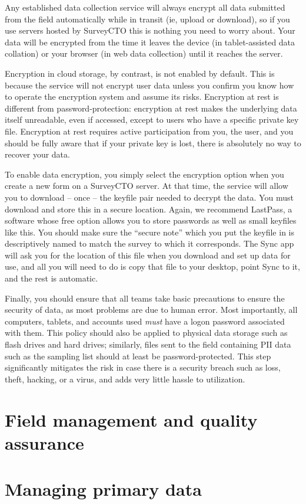 Any established data collection service will always encrypt
all data submitted from the field automatically while in transit
(ie, upload or download), so if you use servers hosted by SurveyCTO
this is nothing you need to worry about.
Your data will be encrypted from the time it leaves the device
(in tablet-assisted data collation) or your browser (in web data collection)
until it reaches the server.


Encryption in cloud storage, by contrast, is not enabled by default.
This is because the service will not encrypt user data unless you confirm
you know how to operate the encryption system and assume its risks.
Encryption at rest is different from password-protection:
encryption at rest makes the underlying data itself unreadable,
even if accessed, except to users who have a specific private key file.
Encryption at rest requires active participation from you, the user,
and you should be fully aware that if your private key is lost,
there is absolutely no way to recover your data.

To enable data encryption, you simply select the encryption option
when you create a new form on a SurveyCTO server.
At that time, the service will allow you to download -- once --
the keyfile pair needed to decrypt the data.
You must download and store this in a secure location.
Again, we recommend LastPass, a software whose free option
allows you to store passwords as well as small keyfiles like this.
You should make sure the ``secure note'' which you put the keyfile in
is descriptively named to match the survey to which it corresponds.
The Sync app will ask you for the location of this file
when you download and set up data for use,
and all you will need to do is copy that file to your desktop,
point Sync to it, and the rest is automatic.

Finally, you should ensure that all teams take basic precautions
to ensure the security of data, as most problems are due to human error.
Most importantly, all computers, tablets, and accounts used
\textit{must} have a logon password associated with them.
This policy should also be applied to physical data storage
such as flash drives and hard drives;
similarly, files sent to the field containing PII data
such as the sampling list should at least be password-protected.
This step significantly mitigates the risk in case there is
a security breach such as loss, theft, hacking, or a virus,
and adds very little hassle to utilization.



\section{Field management and quality assurance}


\section{Managing primary data}
